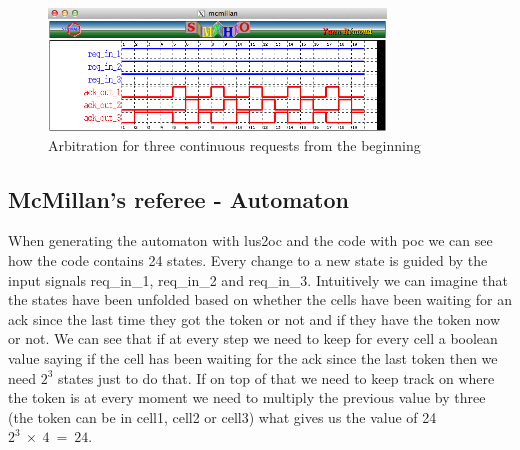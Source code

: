\documentclass{article}
\begin{document}
\begin{itemize}
\begin{figure}[!ht]
\begin{center}
\includegraphics[width=0.8\textwidth, natwidth=610,natheight=642] {img/three-continuosly-from-beginning.png}
\end{center}
\label{three-continuosly-from-beginning}
\caption{Arbitration for three continuous requests from the beginning}
\end{figure}

\end{itemize}

\subsection{McMillan's referee - Automaton}

When generating the automaton with lus2oc and the code with poc we can see how
the code contains 24 states. Every change to a new state is guided by the input
signals req\_in\_1, req\_in\_2 and req\_in\_3. Intuitively we can imagine that
the states have been unfolded based on whether the cells have been waiting for
an ack since the last time they got the token or not and if they have the token
now or not. We can see that if at every step we need to keep for every cell
a boolean value saying if the cell has been waiting for the ack since the last
token then we need $2^{3}$ states just to do that. If on top of that we need
to keep track on where the token is at every moment we need to multiply the 
previous value by three (the token can be in cell1, cell2 or cell3) what
gives us the value of 24 $2^{3}~\times~4~=~24$.

\end{document}
